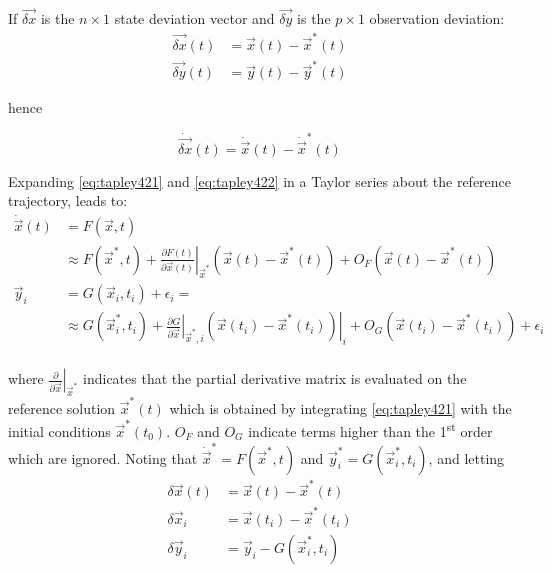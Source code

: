 If \(\vec{\delta x}\) is the \( n \times 1 \) state deviation vector and 
\(\vec{\delta y}\) is the \(p \times 1\) observation deviation:
\begin{equation}
  \begin{aligned}
    \vec{\delta x} (t) &= \vec{x}(t) - \vec{x}^* (t) \\
    \vec{\delta y} (t) &= \vec{y}(t) - \vec{y}^*(t)
  \end{aligned}
\end{equation}

hence

\begin{equation}
  \dot{\vec{\delta x}} (t) = \dot{\vec{x}} (t) - \dot{\vec{x}}^* (t)
\end{equation}

Expanding \ref{eq:tapley421} and \ref{eq:tapley422} in a Taylor series about the 
reference trajectory, leads to:
\begin{equation}
\label{eq:tapley425}
\begin{aligned}
  \dot{\vec{x}} (t) &= F (\vec{x}, t) \\
   & \approx F (\vec{x}^* , t) 
    + \left.\frac{\partial F(t)}{\partial \vec{x}(t)}\right|_{\vec{x}^*} \left( \vec{x}(t) - \vec{x}^* (t) \right)
    + O_F \left( \vec{x}(t) - \vec{x}^* (t) \right) \\
    \vec{y}_i &= G( \vec{x}_i , t_i ) + {\epsilon}_i = \\ & \approx G( \vec{x}^*_i , t_i )
    + \left.\frac{\partial G}{\partial \vec{x}}\right|_{\vec{x}^* , i} \left.\left( \vec{x}(t_i) - \vec{x}^* (t_i) \right)\right|_{i} 
    + O_G \left( \vec{x}(t_i) - \vec{x}^* (t_i) \right) + {\epsilon}_i \\
\end{aligned}
\end{equation}

where \(\left.\frac{\partial}{\partial \vec{x}}\right|_{\vec{x}^*}\) indicates that 
the partial derivative matrix is evaluated on the reference solution \(\vec{x}^* (t)\) 
which is obtained by integrating \ref{eq:tapley421} with the initial conditions 
\(\vec{x}^* (t_0)\). \(O_F\) and \(O_G\) indicate terms higher than the 1\textsuperscript{st} 
order which are ignored. Noting that \(\dot{\vec{x}}^* = F(\vec{x}^* ,t)\) and 
\(\vec{y}^*_i = G(\vec{x}^*_i , t_i )\), and letting
\begin{subequations}
\begin{align}
\delta \vec{x}(t) & = \vec{x}(t) - \vec{x}^*(t) \label{eq:tapley426ua} \\
\delta \vec{x}_i  & = \vec{x}(t_i) - \vec{x}^*(t_i)\label{eq:tapley426ub}\\
\delta \vec{y}_i  & = \vec{y}_i - G(\vec{x}^*_i , t_i ) \label{eq:tapley426uc}
\end{align}
\end{subequations}

